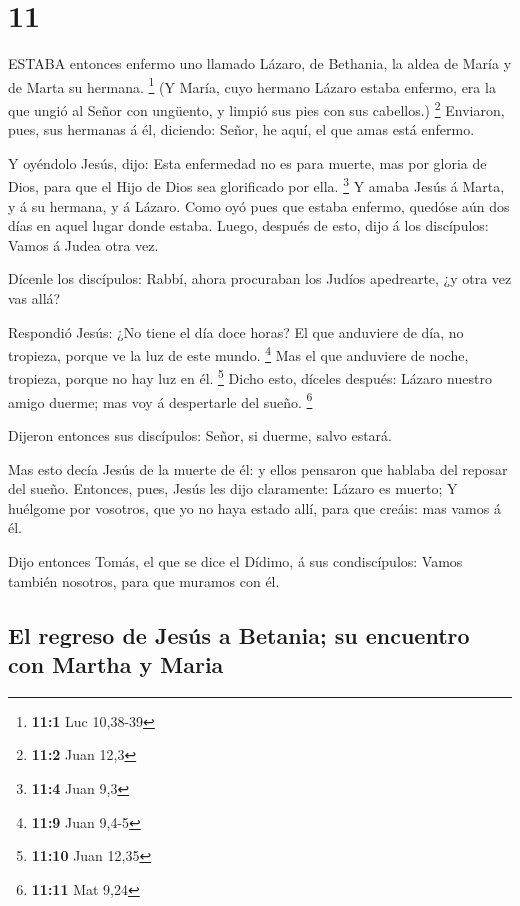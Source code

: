 \hypertarget{section-10}{%
\section{11}\label{section-10}}

 ESTABA entonces enfermo uno llamado Lázaro, de Bethania, la
aldea de María y de Marta su hermana. \footnote{\textbf{11:1} Luc
  10,38-39}  (Y María, cuyo hermano Lázaro estaba enfermo,
era la que ungió al Señor con ungüento, y limpió sus pies con sus
cabellos.) \footnote{\textbf{11:2} Juan 12,3}  Enviaron,
pues, sus hermanas á él, diciendo: Señor, he aquí, el que amas está
enfermo.

 Y oyéndolo Jesús, dijo: Esta enfermedad no es para muerte,
mas por gloria de Dios, para que el Hijo de Dios sea glorificado por
ella. \footnote{\textbf{11:4} Juan 9,3}  Y amaba Jesús á
Marta, y á su hermana, y á Lázaro.  Como oyó pues que estaba
enfermo, quedóse aún dos días en aquel lugar donde estaba. 
Luego, después de esto, dijo á los discípulos: Vamos á Judea otra vez.

 Dícenle los discípulos: Rabbí, ahora procuraban los Judíos
apedrearte, ¿y otra vez vas allá?

 Respondió Jesús: ¿No tiene el día doce horas? El que
anduviere de día, no tropieza, porque ve la luz de este mundo.
\footnote{\textbf{11:9} Juan 9,4-5}  Mas el que anduviere
de noche, tropieza, porque no hay luz en él. \footnote{\textbf{11:10}
  Juan 12,35}  Dicho esto, díceles después: Lázaro nuestro
amigo duerme; mas voy á despertarle del sueño. \footnote{\textbf{11:11}
  Mat 9,24}

 Dijeron entonces sus discípulos: Señor, si duerme, salvo
estará.

 Mas esto decía Jesús de la muerte de él: y ellos pensaron
que hablaba del reposar del sueño.  Entonces, pues, Jesús
les dijo claramente: Lázaro es muerto;  Y huélgome por
vosotros, que yo no haya estado allí, para que creáis: mas vamos á él.

 Dijo entonces Tomás, el que se dice el Dídimo, á sus
condiscípulos: Vamos también nosotros, para que muramos con él.

\hypertarget{el-regreso-de-jesuxfas-a-betania-su-encuentro-con-martha-y-maria}{%
\subsection{El regreso de Jesús a Betania; su encuentro con Martha y
Maria}\label{el-regreso-de-jesuxfas-a-betania-su-encuentro-con-martha-y-maria}}


